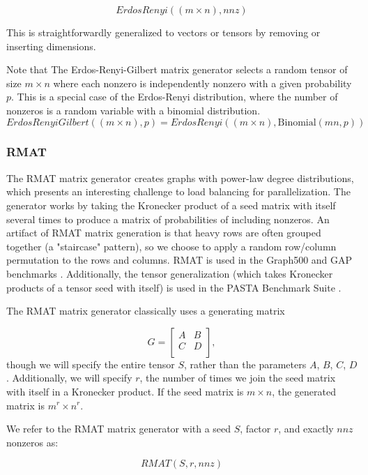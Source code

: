 \documentclass{article}
\begin{document}
	\[
		ErdosRenyi((m \times n), nnz)
	\]

	This is straightforwardly generalized to vectors or tensors by removing or inserting dimensions.
	
	Note that The Erdos-Renyi-Gilbert matrix generator selects a random tensor of size $m \times n$ where each nonzero is independently nonzero with a given probability $p$. This is a special case of the Erdos-Renyi distribution, where the number of nonzeros is a random variable with a binomial distribution.
	\[
		ErdosRenyiGilbert((m \times n), p) = ErdosRenyi((m \times n), \text{Binomial}(mn, p))
	\]

\subsubsection{RMAT}
    The RMAT matrix generator \cite{chakrabarti_r-mat_2004} creates graphs with
    power-law degree distributions, which presents an interesting challenge to
    load balancing for parallelization. The generator works by taking the
    Kronecker product of a seed matrix with itself several times to produce a
    matrix of probabilities of including nonzeros. An artifact of RMAT matrix
    generation is that heavy rows are often grouped together (a "staircase"
    pattern), so we choose to apply a random row/column permutation to the rows
    and columns. RMAT is used in the Graph500 and GAP benchmarks
    \cite{noauthor_graph_nodate, beamer_gap_2017}. Additionally, the tensor
    generalization (which takes Kronecker products of a tensor seed with itself)
    is used in the PASTA Benchmark Suite \cite{li_pasta_2019}.

    The RMAT matrix generator classically uses a generating matrix

	\[
		G = \left[\begin{array}{cc}
			A & B \\
			C & D \\
		\end{array}\right],
	\]
	though we will specify the entire tensor $S$, rather than the parameters
	$A$, $B$, $C$, $D$. Additionally, we will specify $r$, the number of times we join the seed matrix with itself in a Kronecker product. If the seed matrix is $m \times n$, the generated matrix is $m^r \times n^r$.

	We refer to the RMAT matrix generator with a seed $S$, factor $r$, and exactly $nnz$ nonzeros as:

	\[
		RMAT(S, r, nnz)
	\]
\end{document}
